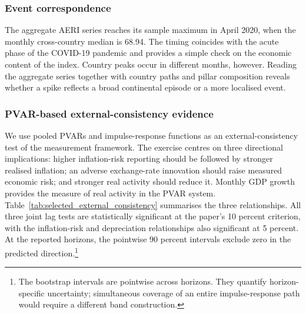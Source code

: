 \documentclass[12pt]{article}
\begin{document}
\subsubsection{Event correspondence}
The aggregate AERI series reaches its sample maximum in April 2020, when the monthly cross-country median is 68.94. The timing coincides with the acute phase of the COVID-19 pandemic and provides a simple check on the economic content of the index. Country peaks occur in different months, however. Reading the aggregate series together with country paths and pillar composition reveals whether a spike reflects a broad continental episode or a more localised event.

\subsubsection{PVAR-based external-consistency evidence}
We use pooled PVARs and impulse-response functions as an external-consistency test of the measurement framework. The exercise centres on three directional implications: higher inflation-risk reporting should be followed by stronger realised inflation; an adverse exchange-rate innovation should raise measured economic risk; and stronger real activity should reduce it. Monthly GDP growth provides the measure of real activity in the PVAR system. Table~\ref{tab:selected_external_consistency} summarises the three relationships. All three joint lag tests are statistically significant at the paper's 10 percent criterion, with the inflation-risk and depreciation relationships also significant at 5 percent. At the reported horizons, the pointwise 90 percent intervals exclude zero in the predicted direction.\footnote{The bootstrap intervals are pointwise across horizons. They quantify horizon-specific uncertainty; simultaneous coverage of an entire impulse-response path would require a different band construction.}

\end{document}
